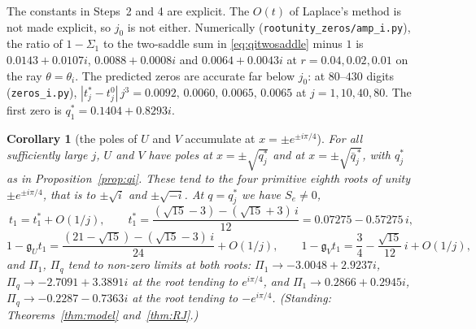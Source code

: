 \documentclass[11pt]{article}
\theoremstyle{plain}
\newtheorem{corollary}[theorem]{Corollary}
\theoremstyle{definition}
\theoremstyle{remark}
\theoremstyle{plain}\newtheorem*{maintheorem}{Main Theorem}
\begin{document}
\noindent The constants in Steps~2 and 4 are explicit. The $O(t)$ of Laplace's method is not made
explicit, so $j_0$ is not either. Numerically (\texttt{rootunity\_zeros/amp\_i.py}), the ratio of
$1-\Sigma_1$ to the two-saddle sum in \eqref{eq:qitwosaddle} minus $1$ is $0.0143+0.0107i$,
$0.0088+0.0008i$ and $0.0064+0.0043i$ at $r=0.04,0.02,0.01$ on the ray $\theta=\theta_i$. The
predicted zeros are accurate far below $j_0$: at $80$--$430$ digits (\texttt{zeros\_i.py}),
$|t^\ast_j-t^0_j|\,j^3=0.0092,\,0.0060,\,0.0065,\,0.0065$ at $j=1,10,40,80$. The first zero is
$q^\ast_1=0.1404+0.8293i$.

\begin{corollary}[the poles of $U$ and $V$ accumulate at $x=\pm e^{\pm i\pi/4}$]\label{cor:Ui}
For all sufficiently large $j$, $U$ and $V$ have poles at $x=\pm\sqrt{q^\ast_j}$ and at
$x=\pm\sqrt{\bar q^{\,\ast}_j}$, with $q^\ast_j$ as in Proposition~\ref{prop:qi}. These tend to the four
primitive eighth roots of unity $\pm e^{\pm i\pi/4}$, that is to $\pm\sqrt i$ and $\pm\sqrt{-i}$. At
$q=q^\ast_j$ we have $S_e\ne0$,
\[
   t_1=t_1^\ast+O(1/j),\qquad t_1^\ast=\frac{(\sqrt{15}-3)-(\sqrt{15}+3)\,i}{12}=0.07275-0.57275\,i,
\]
\[
   1-\mathfrak g_Ut_1=\frac{(21-\sqrt{15})-(\sqrt{15}-3)\,i}{24}+O(1/j),\qquad
   1-\mathfrak g_Vt_1=\frac34-\frac{\sqrt{15}}{12}\,i+O(1/j),
\]
and $\Pi_1$, $\Pi_q$ tend to non-zero limits at both roots:
$\Pi_1\to-3.0048+2.9237i$, $\Pi_q\to-2.7091+3.3891i$ at the root tending to $e^{i\pi/4}$, and
$\Pi_1\to0.2866+0.2945i$, $\Pi_q\to-0.2287-0.7363i$ at the root tending to $-e^{i\pi/4}$.
\textup{(}Standing: Theorems~\ref{thm:model} and~\ref{thm:RJ}.\textup{)}
\end{corollary}
\end{document}
